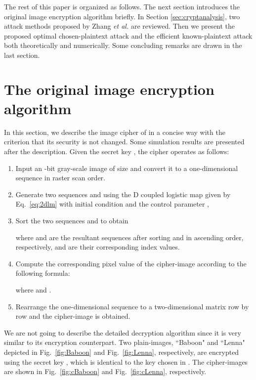 \documentclass[smallextended, final]{svjour3}          \smartqed
\begin{document}
The rest of this paper is organized as follows. The next section
introduces the original image encryption algorithm briefly.
In Section \ref{sec:cryptanalysis}, two attack methods proposed
by Zhang \textit{et al.} are reviewed. Then we present the proposed optimal
chosen-plaintext attack and the efficient known-plaintext attack both theoretically and numerically.
Some concluding remarks are drawn in the last section.

\section{The original image encryption algorithm}
\label{sec:alogrithm}
In this section, we describe the image cipher of \cite{li2012image} in a concise way with
the criterion that  its security is not changed. Some simulation results are presented after the description.
Given the secret key ,
the cipher operates as follows:

\begin{enumerate}\item Input an -bit gray-scale image of size  and convert it to a
one-dimensional sequence  in raster scan order.

\item Generate two sequences  and 
using the D coupled logistic map given by Eq.~\eqref{eq:2dlm}
with initial condition  and the control parameter
,


\item Sort the two sequences  and 
to obtain

where  and  are the resultant sequences after
sorting  and  in ascending order, respectively,
 and  are their corresponding index values.

\item Compute the corresponding pixel value of the cipher-image according to the following formula:

where  and .

\item Rearrange the one-dimensional sequence  to a two-dimensional matrix
row by row and the cipher-image is obtained.
\end{enumerate}

We are not going to describe the detailed decryption algorithm since it is very similar to its encryption counterpart.
Two  plain-images, ``Baboon" and ``Lenna" depicted in Fig.~\ref{fig:Baboon} and Fig.~\ref{fig:Lenna}, respectively,  are encrypted
using the secret key ,
which is identical to the key chosen in \cite[Sec.~4.1]{li2012image}.
The cipher-images are shown in Fig.~\ref{fig:cBaboon} and Fig.~\ref{fig:cLenna}, respectively.
\end{document}
